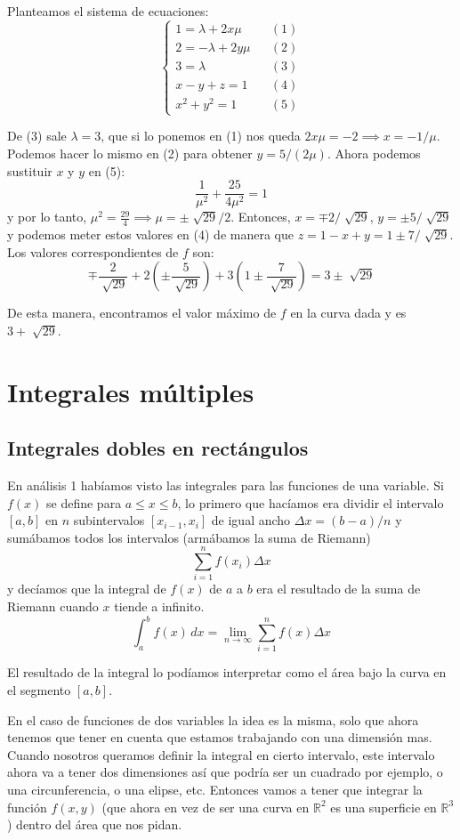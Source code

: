 \documentclass[12pt]{article}
\begin{document}
Planteamos el sistema de ecuaciones:
\[
  \left\{
  \begin{aligned}
	  1 = \lambda + 2x\mu &&(1) \\
	  2 = -\lambda + 2y\mu &&(2) \\
	  3 = \lambda &&(3) \\
	  x-y+z=1 &&(4) \\
	  x^2 + y^2 = 1 &&(5)
  \end{aligned}
  \right.
\]

De (3) sale $ \lambda = 3 $, que si lo ponemos en (1) nos queda $ 2x\mu = -2 \implies x=-1/\mu $. Podemos hacer lo mismo en (2) para obtener $ y=5/(2\mu) $. Ahora podemos sustituir $ x $ y $ y $ en (5):
\[
  \frac{1}{\mu^2} + \frac{25}{4\mu^2} = 1
\]
y por lo tanto, $ \mu^2=\frac{29}{4} \implies \mu=\pm \sqrt[]{29}/2 $. Entonces, $ x=\mp 2/\sqrt[]{29} $, $ y=\pm 5/\sqrt[]{29} $ y podemos meter estos valores en (4) de manera que $ z=1-x+y=1\pm 7/\sqrt[]{29} $. Los valores correspondientes de $ f $ son:
\[
  \mp \frac{2}{\sqrt[]{29}}+2\left(\pm\frac{5}{\sqrt[]{29}}\right)+3\left(1\pm\frac{7}{\sqrt[]{29}}\right)=3\pm \sqrt[]{29}
\]

De esta manera, encontramos el valor máximo de $ f $ en la curva dada y es $ 3+\sqrt[]{29} $.

\section{Integrales múltiples}
\subsection{Integrales dobles en rectángulos}
En análisis 1 habíamos visto las integrales para las funciones de una variable. Si $ f(x) $ se define para $ a\leq x\leq b $, lo primero que hacíamos era dividir el intervalo $ \left[a,b\right] $ en $ n $ subintervalos $ \left[x_{i-1},x_{i}\right] $ de igual ancho $ \Delta x=(b-a)/n $ y sumábamos todos los intervalos (armábamos la suma de Riemann)
\[
  \sum_{i=1}^{n} f(x_{i})\Delta x
\]
y decíamos que la integral de $ f(x) $ de $ a $ a $ b $ era el resultado de la suma de Riemann cuando $ x $ tiende a infinito.
\[
  \int_{a}^{b} f(x) \,dx = \lim_{n \to \infty}\sum_{i=1}^{n} f(x)\Delta x
\]

El resultado de la integral lo podíamos interpretar como el área bajo la curva en el segmento $ \left[a,b\right] $.

En el caso de funciones de dos variables la idea es la misma, solo que ahora tenemos que tener en cuenta que estamos trabajando con una dimensión mas. Cuando nosotros queramos definir la integral en cierto intervalo, este intervalo ahora va a tener dos dimensiones así que podría ser un cuadrado por ejemplo, o una circunferencia, o una elipse, etc. Entonces vamos a tener que integrar la función $ f(x,y) $ (que ahora en vez de ser una curva en $ \mathbb{R}^{2} $ es una superficie en $ \mathbb{R}^{3} $) dentro del área que nos pidan.
\end{document}
